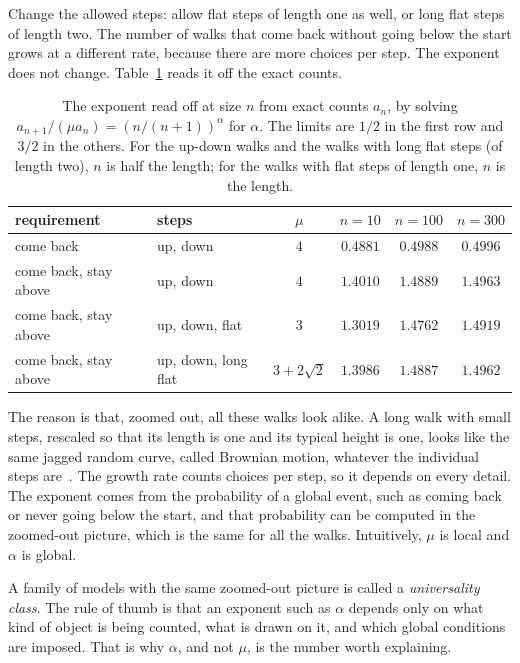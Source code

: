 Change the allowed steps: allow flat steps of length one as well, or long flat steps of length two. The number
of walks that come back without going below the start grows at a different rate, because there
are more choices per step. The exponent does not change. Table~\ref{tab:walks} reads it off the
exact counts.

\begin{table}[h]
\centering
\begin{tabular}{llcccc}
\toprule
requirement & steps & $\mu$ & $n=10$ & $n=100$ & $n=300$\\
\midrule
come back & up, down & $4$ & $0.4881$ & $0.4988$ & $0.4996$\\
come back, stay above & up, down & $4$ & $1.4010$ & $1.4889$ & $1.4963$\\
come back, stay above & up, down, flat & $3$ & $1.3019$ & $1.4762$ & $1.4919$\\
come back, stay above & up, down, long flat & $3+2\sqrt2$ & $1.3986$ & $1.4887$ & $1.4962$\\
\bottomrule
\end{tabular}
\caption{The exponent read off at size $n$ from exact counts $a_n$, by solving
$a_{n+1}/(\mu a_n)=(n/(n+1))^{\alpha}$ for $\alpha$. The limits are $1/2$ in the first row and
$3/2$ in the others. For the up-down walks and the walks with long flat steps (of length two),
$n$ is half the length; for the walks with flat steps of length one, $n$ is the length.}
\label{tab:walks}
\end{table}

The reason is that, zoomed out, all these walks look alike. A long walk with small steps,
rescaled so that its length is one and its typical height is one, looks like the same jagged
random curve, called Brownian motion, whatever the individual steps are~\cite{Donsker}. The growth rate
counts choices per step, so it depends on every detail. The exponent comes from the
probability of a global event, such as coming back or never going below the start, and that
probability can be computed in the zoomed-out picture, which is the same for all the walks.
Intuitively, $\mu$ is local and $\alpha$ is global.

A family of models with the same zoomed-out picture is called a \emph{universality class}. The
rule of thumb is that an exponent such as $\alpha$ depends only on what kind of object is being
counted, what is drawn on it, and which global conditions are imposed. That is why $\alpha$,
and not $\mu$, is the number worth explaining.


